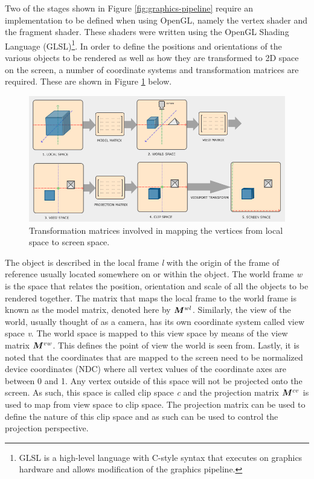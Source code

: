 Two of the stages shown in Figure \ref{fig:graphics-pipeline} require an implementation to be defined when using OpenGL, namely the vertex shader and the fragment shader. These shaders were written using the  OpenGL Shading Language (GLSL)\footnote{GLSL is a high-level language with C-style syntax that executes on graphics hardware and allows modification of the graphics pipeline.}. In order to define the positions and orientations of the various objects to be rendered as well as how they are transformed to 2D space on the screen, a number of coordinate systems and transformation matrices are required. These are shown in Figure \ref{fig:transformation-matrices} below.


\begin{figure}[!ht]
	\centering
	\includegraphics[width=1\linewidth]{figures/transformation-matrices.PNG}
	\caption{Transformation matrices involved in mapping the vertices from local space to screen space.}
	\label{fig:transformation-matrices}
\end{figure}

The object is described in the local frame \textit{l} with the origin of the frame of reference usually located somewhere on or within the object. The world frame \textit{w} is the space  that relates the position, orientation and scale of all the objects to be rendered together. The matrix that maps the local frame to the world frame is known as the model matrix, denoted here by $\bm{M}^{wl}$. Similarly, the view of the world, usually thought of as a camera, has its own coordinate system called view space \textit{v}. The world space is mapped to this view space by means of the view matrix $\bm{M}^{vw}$. This defines the point of view the world is seen from. Lastly, it is noted that the coordinates that are mapped to the screen need to be normalized device coordinates (NDC) where all vertex values of the coordinate axes are between 0 and 1. Any vertex outside of this space will not be projected onto the screen. As such, this space is called clip space \textit{c} and the projection matrix $\bm{M}^{cv}$ is used to map from view space to clip space. The projection matrix can be used to define the nature of this clip space and as such can be used to control the projection perspective. 

